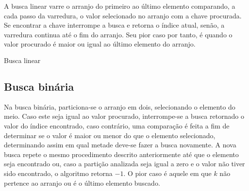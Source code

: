 A busca linear varre o arranjo do primeiro ao último elemento comparando, a cada passo da varredura, o valor selecionado no arranjo com a chave procurada. Se encontrar a chave interrompe a busca e retorna o índice atual, senão, a varredura continua até o fim do arranjo. Seu pior caso por tanto, é quando o valor procurado é maior ou igual ao último elemento do arranjo.

\begin{algorithm}[H]
  \DontPrintSemicolon
  \SetAlgoLined
  \caption{Busca linear}

  \BlankLine

\end{algorithm}



\subsection{Busca binária}

Na busca binária, particiona-se o arranjo em dois, selecionando o elemento do meio. Caso este seja igual ao valor procurado, interrompe-se a busca retornado o valor do índice encontrado, caso contrário, uma comparação é feita a fim de determinar se o valor é maior ou menor do que o elemento selecionado, determinando assim em qual metade deve-se fazer a busca novamente. A nova busca repete o mesmo procedimento descrito anteriormente até que o elemento seja encontrado ou, caso a partição analizada seja igual a zero e o valor não tiver sido encontrado, o algoritmo retorna $-1$. O pior caso é aquele em que $k$ não pertence ao arranjo ou é o último elemento buscado.

